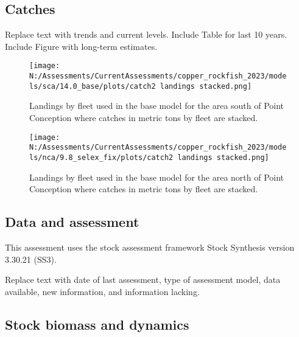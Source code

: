 \documentclass[11pt,
  english,
  letterpaper,
]{article}
\begin{document}
\hypertarget{catches}{%
\subsection*{Catches}\label{catches}}

Replace text with trends and current levels. Include Table for last 10 years. Include Figure with long-term estimates.





\begin{figure}
\centering
\texttt{[image: N:/Assessments/CurrentAssessments/copper\_rockfish\_2023/models/sca/14.0\_base/plots/catch2 landings stacked.png]}
\caption{Landings by fleet used in the base model for the area south of Point Conception where catches in metric tons by fleet are stacked.\label{fig:es-south-catch}}
\end{figure}

\begin{figure}
\centering
\texttt{[image: N:/Assessments/CurrentAssessments/copper\_rockfish\_2023/models/nca/9.8\_selex\_fix/plots/catch2 landings stacked.png]}
\caption{Landings by fleet used in the base model for the area north of Point Conception where catches in metric tons by fleet are stacked.\label{fig:es-north-catch}}
\end{figure}

\hypertarget{data-and-assessment}{%
\subsection*{Data and assessment}\label{data-and-assessment}}

This assessment uses the stock assessment framework Stock Synthesis version 3.30.21 (SS3).

Replace text with date of last assessment, type of assessment model, data available, new information, and information lacking.

\hypertarget{stock-biomass-and-dynamics}{%
\subsection*{Stock biomass and dynamics}\label{stock-biomass-and-dynamics}}
\end{document}
